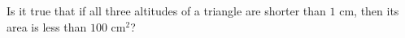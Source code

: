 Is it true that if all three altitudes of a triangle are shorter than $1$ cm, then its area is less than $100$ cm$^2$?
